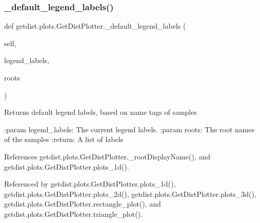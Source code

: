 \subsubsection{\texorpdfstring{\+\_\+default\+\_\+legend\+\_\+labels()}{\_default\_legend\_labels()}}
{\footnotesize\ttfamily def getdist.\+plots.\+Get\+Dist\+Plotter.\+\_\+default\+\_\+legend\+\_\+labels (\begin{DoxyParamCaption}\item[{}]{self,  }\item[{}]{legend\+\_\+labels,  }\item[{}]{roots }\end{DoxyParamCaption})\hspace{0.3cm}{\ttfamily [private]}}

\begin{DoxyVerb}Returns default legend labels, based on name tags of samples

:param legend_labels: The current legend labels.
:param roots: The root names of the samples
:return: A list of labels
\end{DoxyVerb}
 

References getdist.\+plots.\+Get\+Dist\+Plotter.\+\_\+root\+Display\+Name(), and getdist.\+plots.\+Get\+Dist\+Plotter.\+plots\+\_\+1d().



Referenced by getdist.\+plots.\+Get\+Dist\+Plotter.\+plots\+\_\+1d(), getdist.\+plots.\+Get\+Dist\+Plotter.\+plots\+\_\+2d(), getdist.\+plots.\+Get\+Dist\+Plotter.\+plots\+\_\+3d(), getdist.\+plots.\+Get\+Dist\+Plotter.\+rectangle\+\_\+plot(), and getdist.\+plots.\+Get\+Dist\+Plotter.\+triangle\+\_\+plot().

